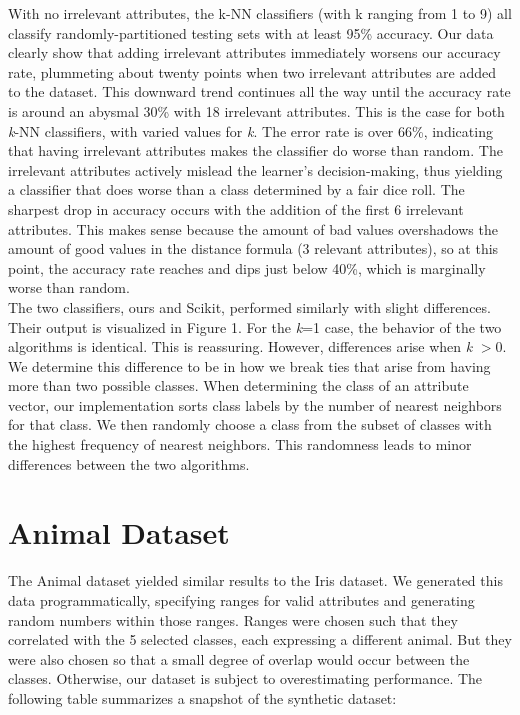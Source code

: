 \documentclass{article}
\begin{document}
With no irrelevant attributes, the k-NN classifiers (with k ranging from 1 to 9) all classify randomly-partitioned testing sets with at least 95\% accuracy. Our data clearly show that adding irrelevant attributes immediately worsens our accuracy rate, plummeting about twenty points when two irrelevant attributes are added to the dataset. This downward trend continues all the way until the accuracy rate is around an abysmal 30\% with 18 irrelevant attributes. This is the case for both \textit{k}-NN classifiers, with varied values for \textit{k}. The error rate is over 66\%, indicating that having irrelevant attributes makes the classifier do worse than random. The irrelevant attributes actively mislead the learner's decision-making, thus yielding a classifier that does worse than a class determined by a fair dice roll. The sharpest drop in accuracy occurs with the addition of the first 6 irrelevant attributes. This makes sense because the amount of bad values overshadows the amount of good values in the distance formula (3 relevant attributes), so at this point, the accuracy rate reaches and dips just below 40\%, which is marginally worse than random. \\

The two classifiers, ours and Scikit, performed similarly with slight differences. Their output is visualized in Figure 1. For the \textit{k}=1 case, the behavior of the two algorithms is  identical. This is reassuring. However, differences arise when \textit{k} $>0$. We determine this difference to be in how we break ties that arise from having more than two possible classes. When determining the class of an attribute vector, our implementation sorts class labels by the number of nearest neighbors for that class. We then randomly choose a class from the subset of classes with the highest frequency of nearest neighbors. This randomness leads to minor differences between the two algorithms. 

\pagebreak

\section{Animal Dataset}

The Animal dataset yielded similar results to the Iris dataset. We generated this data programmatically, specifying ranges for valid attributes and generating random numbers within those ranges. Ranges were chosen such that they correlated with the 5 selected classes, each expressing a different animal. But they were also chosen so that a small degree of overlap would occur between the classes. Otherwise, our dataset is subject to overestimating performance. The following table summarizes a snapshot of the synthetic dataset: 
\end{document}
